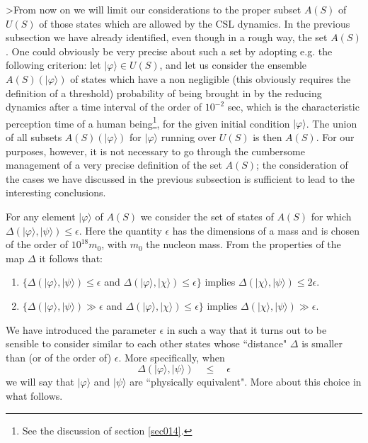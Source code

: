 \documentclass[12pt]{article}
\begin{document}
>From now on we will limit our considerations to the proper subset
$A(S)$ of $U(S)$ of those states which are allowed by the CSL
dynamics. In the previous subsection we have already identified,
even though in a rough way, the set $A(S)$. One could obviously be
very precise about such a set by adopting e.g. the following
criterion: let $|\varphi\rangle \in U(S)$, and let us consider the
ensemble $A(S)(|\varphi\rangle)$ of states which have a non
negligible (this obviously requires the definition of a threshold)
probability of being brought in by the reducing dynamics after a
time interval of the order of $10^{-2}$ sec, which is the
characteristic perception time of a human being\footnote{See the
discussion of section \ref{sec014}.}, for the given initial
condition $|\varphi\rangle$. The union of all subsets
$A(S)(|\varphi\rangle)$ for $|\varphi\rangle$ running over $U(S)$
is then $A(S)$. For our purposes, however, it is not necessary to
go through the cumbersome management of a very precise definition
of the set $A(S)$; the consideration of the cases we have
discussed in the previous subsection is sufficient to lead to the
interesting conclusions.

For any element $|\varphi\rangle$ of $A(S)$ we consider the set of
states of $A(S)$ for which $\Delta (|\varphi\rangle, |\psi\rangle)
\leq \epsilon$. Here the quantity $\epsilon$ has the dimensions of
a mass and is chosen of the order of $10^{18} m_{0}$, with $m_{0}$
the nucleon mass. From the properties of the map $\Delta$ it
follows that:
\begin{enumerate}
\item $ \{ \Delta (|\varphi\rangle, |\psi\rangle) \leq \epsilon$
and $\Delta (|\varphi\rangle, |\chi\rangle) \leq \epsilon \}$
implies $\Delta (|\chi\rangle, |\psi\rangle) \leq 2\epsilon.$
\item $ \{ \Delta (|\varphi\rangle, |\psi\rangle) \gg \epsilon$
and $\Delta (|\varphi\rangle, |\chi\rangle) \leq \epsilon \}$
implies $\Delta (|\chi\rangle, |\psi\rangle) \gg \epsilon.$
\end{enumerate}

We have introduced the parameter $\epsilon$ in such a way that it
turns out to be sensible to consider similar to each other states
whose ``distance" $\Delta$ is smaller than (or of the order of)
$\epsilon$. More specifically, when
\begin{equation} \label{ctu}
\Delta (|\varphi\rangle, |\psi\rangle) \quad \leq \quad \epsilon
\end{equation}
we will say that $|\varphi\rangle$ and $|\psi\rangle$ are
``physically equivalent". More about this choice in what follows.
\end{document}
